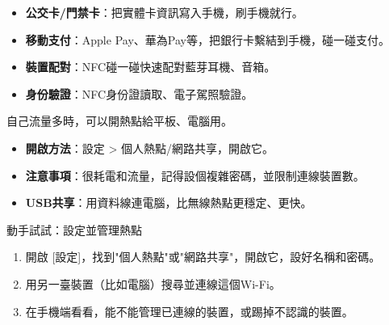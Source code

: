 
\begin{itemize}
  \item \textbf{公交卡/門禁卡}：把實體卡資訊寫入手機，刷手機就行。
  \item \textbf{移動支付}：Apple Pay、華為Pay等，把銀行卡繫結到手機，碰一碰支付。
  \item \textbf{裝置配對}：NFC碰一碰快速配對藍芽耳機、音箱。
  \item \textbf{身份驗證}：NFC身份證讀取、電子駕照驗證。
\end{itemize}


自己流量多時，可以開熱點給平板、電腦用。

\begin{itemize}
  \item \textbf{開啟方法}：設定 > 個人熱點/網路共享，開啟它。
  \item \textbf{注意事項}：很耗電和流量，記得設個複雜密碼，並限制連線裝置數。
  \item \textbf{USB共享}：用資料線連電腦，比無線熱點更穩定、更快。
\end{itemize}

\begin{tcbpractice}{動手試試：設定並管理熱點}
\begin{enumerate}
  \item 開啟 [設定]，找到"個人熱點"或"網路共享"，開啟它，設好名稱和密碼。
  \item 用另一臺裝置（比如電腦）搜尋並連線這個Wi-Fi。
  \item 在手機端看看，能不能管理已連線的裝置，或踢掉不認識的裝置。
\end{enumerate}

\end{tcbpractice}
